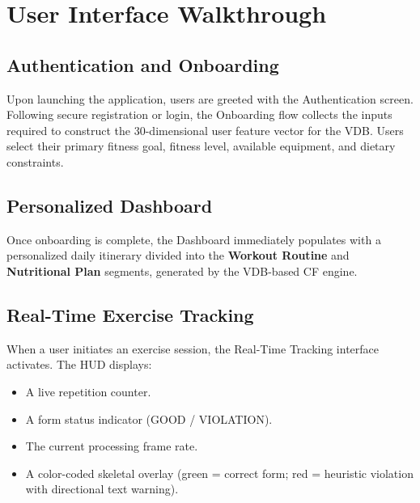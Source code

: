 \section{User Interface Walkthrough}
\label{sec:ui}

\subsection{Authentication and Onboarding}

\large

Upon launching the application, users are greeted with the Authentication screen. Following secure registration or login, the Onboarding flow collects the inputs required to construct the 30-dimensional user feature vector for the VDB. Users select their primary fitness goal, fitness level, available equipment, and dietary constraints.

\normalsize



\vspace{0.3cm}



\subsection{Personalized Dashboard}

\large

Once onboarding is complete, the Dashboard immediately populates with a personalized daily itinerary divided into the \textbf{Workout Routine} and \textbf{Nutritional Plan} segments, generated by the VDB-based CF engine.

\normalsize




\subsection{Real-Time Exercise Tracking}

\large

When a user initiates an exercise session, the Real-Time Tracking interface activates. The HUD displays:
\begin{itemize}
    \item A live repetition counter.
    \item A form status indicator (GOOD / VIOLATION).
    \item The current processing frame rate.
    \item A color-coded skeletal overlay (green = correct form; red = heuristic violation with directional text warning).
\end{itemize}

